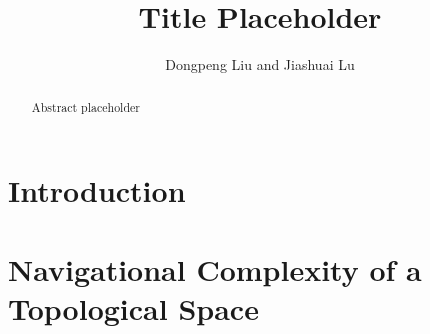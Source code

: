 \documentclass[12pt,twoside]{article}
\begin{document}
\title{Title Placeholder}

\author{
Dongpeng Liu %
and Jiashuai Lu%
}


\maketitle

%
\begin{abstract}
Abstract placeholder
\end{abstract}

\setcounter{page}{0}

\section{Introduction}\label{sec:intro}


\section{Navigational Complexity of a Topological Space}\label{sec:complexity}




\end{document}
